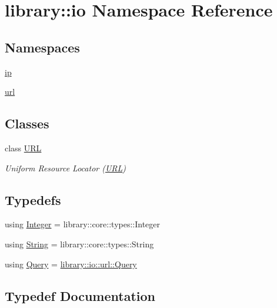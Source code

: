 \hypertarget{namespacelibrary_1_1io}{}\section{library\+:\+:io Namespace Reference}
\label{namespacelibrary_1_1io}
\subsection*{Namespaces}
\begin{DoxyCompactItemize}
\item 
 \hyperlink{namespacelibrary_1_1io_1_1ip}{ip}
\item 
 \hyperlink{namespacelibrary_1_1io_1_1url}{url}
\end{DoxyCompactItemize}
\subsection*{Classes}
\begin{DoxyCompactItemize}
\item 
class \hyperlink{classlibrary_1_1io_1_1_u_r_l}{U\+RL}
\begin{DoxyCompactList}\small\item\em Uniform Resource Locator (\hyperlink{classlibrary_1_1io_1_1_u_r_l}{U\+RL}) \end{DoxyCompactList}\end{DoxyCompactItemize}
\subsection*{Typedefs}
\begin{DoxyCompactItemize}
\item 
using \hyperlink{namespacelibrary_1_1io_a0a929bf9e177597c2e92073d200dda53}{Integer} = library\+::core\+::types\+::\+Integer
\item 
using \hyperlink{namespacelibrary_1_1io_a7469b45835a4421045db344d6a5a1f85}{String} = library\+::core\+::types\+::\+String
\item 
using \hyperlink{namespacelibrary_1_1io_a39ebaf2265de78ba79eb5347f2af61b3}{Query} = \hyperlink{classlibrary_1_1io_1_1url_1_1_query}{library\+::io\+::url\+::\+Query}
\end{DoxyCompactItemize}


\subsection{Typedef Documentation}
\mbox{\label{namespacelibrary_1_1io_a0a929bf9e177597c2e92073d200dda53}} 
